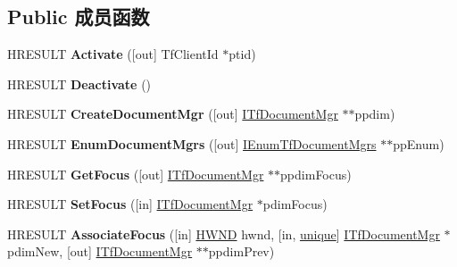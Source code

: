 \subsection*{Public 成员函数}
\begin{DoxyCompactItemize}
\item 
\mbox{\label{interface_i_tf_thread_mgr_a3d087716d4cc8883cbac45c6dde6b5ce}} 
H\+R\+E\+S\+U\+LT {\bfseries Activate} (\mbox{[}out\mbox{]} Tf\+Client\+Id $\ast$ptid)
\item 
\mbox{\label{interface_i_tf_thread_mgr_ad14d15a6d6aa7b9ed2014c70571ded46}} 
H\+R\+E\+S\+U\+LT {\bfseries Deactivate} ()
\item 
\mbox{\label{interface_i_tf_thread_mgr_a986e1e93b2964b2ff03474a38048b46d}} 
H\+R\+E\+S\+U\+LT {\bfseries Create\+Document\+Mgr} (\mbox{[}out\mbox{]} \hyperlink{interface_i_tf_document_mgr}{I\+Tf\+Document\+Mgr} $\ast$$\ast$ppdim)
\item 
\mbox{\label{interface_i_tf_thread_mgr_a1a49b48fef187971a4e6bcc22502a92c}} 
H\+R\+E\+S\+U\+LT {\bfseries Enum\+Document\+Mgrs} (\mbox{[}out\mbox{]} \hyperlink{interface_i_enum_tf_document_mgrs}{I\+Enum\+Tf\+Document\+Mgrs} $\ast$$\ast$pp\+Enum)
\item 
\mbox{\label{interface_i_tf_thread_mgr_af0f5bddd501427c6a95c6ebdf045bc37}} 
H\+R\+E\+S\+U\+LT {\bfseries Get\+Focus} (\mbox{[}out\mbox{]} \hyperlink{interface_i_tf_document_mgr}{I\+Tf\+Document\+Mgr} $\ast$$\ast$ppdim\+Focus)
\item 
\mbox{\label{interface_i_tf_thread_mgr_a80bb24e672876cc563d2b338231c8dd0}} 
H\+R\+E\+S\+U\+LT {\bfseries Set\+Focus} (\mbox{[}in\mbox{]} \hyperlink{interface_i_tf_document_mgr}{I\+Tf\+Document\+Mgr} $\ast$pdim\+Focus)
\item 
\mbox{\label{interface_i_tf_thread_mgr_ac5ac7192ead24ff98ec3e55d2601c820}} 
H\+R\+E\+S\+U\+LT {\bfseries Associate\+Focus} (\mbox{[}in\mbox{]} \hyperlink{interfacevoid}{H\+W\+ND} hwnd, \mbox{[}in, \hyperlink{interfaceunique}{unique}\mbox{]} \hyperlink{interface_i_tf_document_mgr}{I\+Tf\+Document\+Mgr} $\ast$pdim\+New, \mbox{[}out\mbox{]} \hyperlink{interface_i_tf_document_mgr}{I\+Tf\+Document\+Mgr} $\ast$$\ast$ppdim\+Prev)

\end{DoxyCompactItemize}
